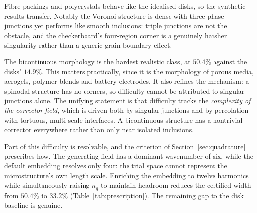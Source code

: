 \begin{table}[t]
\centering
\caption{Certified width for realistic morphologies, scalar conductivity,
$n_q = 64$, $120$ steps. All gate-accepted; all certificates bracketed an
independent finite-volume reference.}
\label{tab:realistic}
\end{table}

Fibre packings and polycrystals behave like the idealised disks, so the
synthetic results transfer. Notably the Voronoi structure is dense with
three-phase junctions yet performs like smooth inclusions: triple junctions
are not the obstacle, and the checkerboard's four-region corner is a
genuinely harsher singularity rather than a generic grain-boundary effect.

The bicontinuous morphology is the hardest realistic class, at $50.4\%$
against the disks' $14.9\%$. This matters practically, since it is the
morphology of porous media, aerogels, polymer blends and battery
electrodes. It also refines the mechanism: a spinodal structure has no
corners, so difficulty cannot be attributed to singular junctions alone.
The unifying statement is that difficulty tracks the \emph{complexity of
the corrector field}, which is driven both by singular junctions and by
percolation with tortuous, multi-scale interfaces. A bicontinuous structure has a nontrivial corrector everywhere rather than only near
isolated inclusions.

Part of this difficulty is resolvable, and the criterion of
Section~\ref{sec:quadrature} prescribes how. The generating field has a
dominant wavenumber of six, while the default embedding resolves only four:
the trial space cannot represent the microstructure's own length scale.
Enriching the embedding to twelve harmonics while simultaneously raising
$n_q$ to maintain headroom reduces the certified width from $50.4\%$ to
$33.2\%$ (Table~\ref{tab:prescription}). The remaining gap to the disk
baseline is genuine.

